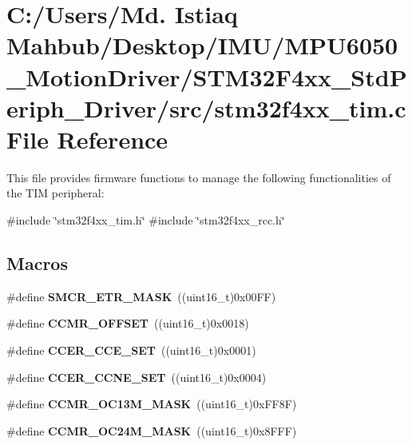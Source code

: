 \section{C\+:/\+Users/\+Md. Istiaq Mahbub/\+Desktop/\+I\+M\+U/\+M\+P\+U6050\+\_\+\+Motion\+Driver/\+S\+T\+M32\+F4xx\+\_\+\+Std\+Periph\+\_\+\+Driver/src/stm32f4xx\+\_\+tim.c File Reference}
\label{stm32f4xx__tim_8c}


This file provides firmware functions to manage the following functionalities of the T\+IM peripheral\+:  


{\ttfamily \#include \char`\"{}stm32f4xx\+\_\+tim.\+h\char`\"{}}\newline
{\ttfamily \#include \char`\"{}stm32f4xx\+\_\+rcc.\+h\char`\"{}}\newline
\subsection*{Macros}
\begin{DoxyCompactItemize}
\item 
\#define \textbf{ S\+M\+C\+R\+\_\+\+E\+T\+R\+\_\+\+M\+A\+SK}~((uint16\+\_\+t)0x00\+F\+F)
\item 
\#define \textbf{ C\+C\+M\+R\+\_\+\+O\+F\+F\+S\+ET}~((uint16\+\_\+t)0x0018)
\item 
\#define \textbf{ C\+C\+E\+R\+\_\+\+C\+C\+E\+\_\+\+S\+ET}~((uint16\+\_\+t)0x0001)
\item 
\#define \textbf{ C\+C\+E\+R\+\_\+\+C\+C\+N\+E\+\_\+\+S\+ET}~((uint16\+\_\+t)0x0004)
\item 
\#define \textbf{ C\+C\+M\+R\+\_\+\+O\+C13\+M\+\_\+\+M\+A\+SK}~((uint16\+\_\+t)0x\+F\+F8\+F)
\item 
\#define \textbf{ C\+C\+M\+R\+\_\+\+O\+C24\+M\+\_\+\+M\+A\+SK}~((uint16\+\_\+t)0x8\+F\+F\+F)
\end{DoxyCompactItemize}
